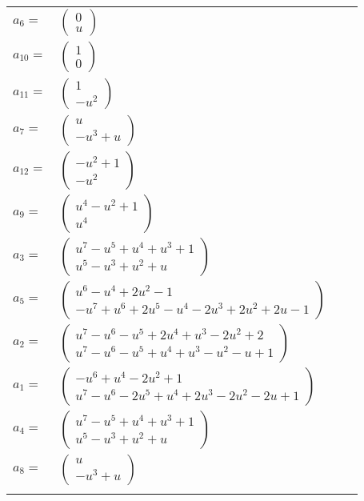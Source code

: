 \documentclass[1p]{elsarticle_modified}
\theoremstyle{definition}
\begin{document}
\begin{tabular}{m{7pt} m{180pt} m{7pt} m{180pt} }
\flushright $a_{6}=$&$\begin{pmatrix}0\\u\end{pmatrix}$ \\
\flushright $a_{10}=$&$\begin{pmatrix}1\\0\end{pmatrix}$ \\
\flushright $a_{11}=$&$\begin{pmatrix}1\\- u^2\end{pmatrix}$ \\
\flushright $a_{7}=$&$\begin{pmatrix}u\\- u^3+u\end{pmatrix}$ \\
\flushright $a_{12}=$&$\begin{pmatrix}- u^2+1\\- u^2\end{pmatrix}$ \\
\flushright $a_{9}=$&$\begin{pmatrix}u^4- u^2+1\\u^4\end{pmatrix}$ \\
\flushright $a_{3}=$&$\begin{pmatrix}u^7- u^5+u^4+u^3+1\\u^5- u^3+u^2+u\end{pmatrix}$ \\
\flushright $a_{5}=$&$\begin{pmatrix}u^6- u^4+2 u^2-1\\- u^7+u^6+2 u^5- u^4-2 u^3+2 u^2+2 u-1\end{pmatrix}$ \\
\flushright $a_{2}=$&$\begin{pmatrix}u^7- u^6- u^5+2 u^4+u^3-2 u^2+2\\u^7- u^6- u^5+u^4+u^3- u^2- u+1\end{pmatrix}$ \\
\flushright $a_{1}=$&$\begin{pmatrix}- u^6+u^4-2 u^2+1\\u^7- u^6-2 u^5+u^4+2 u^3-2 u^2-2 u+1\end{pmatrix}$ \\
\flushright $a_{4}=$&$\begin{pmatrix}u^7- u^5+u^4+u^3+1\\u^5- u^3+u^2+u\end{pmatrix}$ \\
\flushright $a_{8}=$&$\begin{pmatrix}u\\- u^3+u\end{pmatrix}$\\&\end{tabular}
\end{document}
